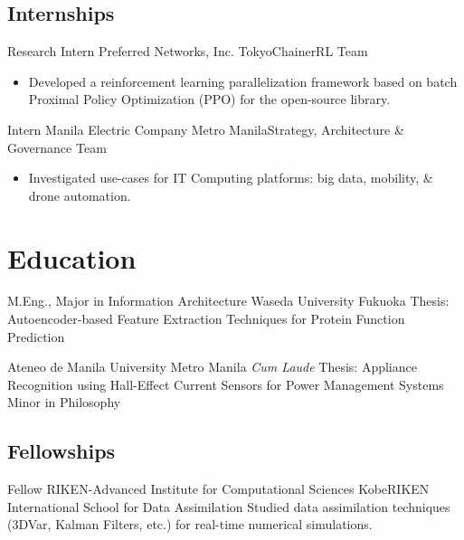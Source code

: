 \documentclass[12pt,a4paper]{moderncv}
\begin{document}
\subsection{Internships}
{Research Intern}
{Preferred Networks, Inc.}
{Tokyo}{ChainerRL Team}
{
    \begin{itemize}
        \item Developed a reinforcement learning parallelization framework
            based on batch Proximal Policy Optimization (PPO) for the
            open-source
            {\color{blue}}
            library.
    \end{itemize}
}

{Intern}
{Manila Electric Company}
{Metro Manila}{Strategy, Architecture \& Governance Team}
{
    \begin{itemize}
        \item Investigated use-cases for IT Computing platforms: big
              data, mobility, \& drone automation.
    \end{itemize}
}


\section{Education}
{M.Eng., Major in Information Architecture}
{Waseda University}
{Fukuoka}{}
{Thesis: Autoencoder-based Feature Extraction Techniques for Protein
    Function Prediction}

{Ateneo de Manila University}
{Metro Manila}
{\textit{Cum Laude}}
{
    Thesis: Appliance Recognition using Hall-Effect Current Sensors for
    Power Management Systems\\
    Minor in Philosophy
}


\subsection{Fellowships}

{Fellow}
{RIKEN-Advanced Institute for Computational Sciences}
{Kobe}{RIKEN International School for Data Assimilation}
{Studied data assimilation techniques (3DVar, Kalman Filters, etc.) for real-time numerical simulations.}
\end{document}

